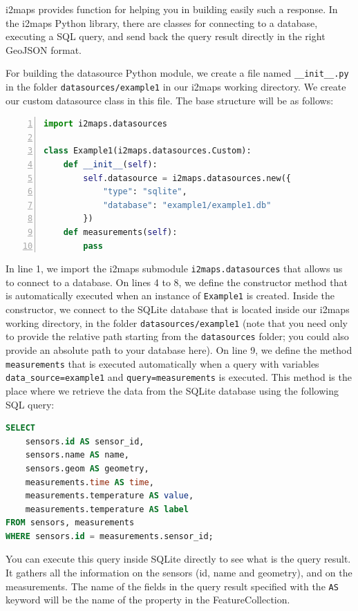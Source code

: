 \documentclass[11pt]{article}
\begin{document}
i2maps provides function for helping you in building easily such a response. In the i2maps Python library, there are classes for connecting to a database, executing a SQL query, and send back the query result directly in the right GeoJSON format.

For building the datasource Python module, we create a file named \verb=__init__.py= in the folder \texttt{datasources/example1} in our i2maps working directory. We create our custom datasource class in this file. The base structure will be as follows:

\begin{lstlisting}[language=Python, numbers=left, numberstyle=\footnotesize, numbersep=5pt]
import i2maps.datasources

class Example1(i2maps.datasources.Custom):
    def __init__(self):
        self.datasource = i2maps.datasources.new({
            "type": "sqlite",
            "database": "example1/example1.db"
        })
    def measurements(self):
        pass
\end{lstlisting}

In line 1, we import the i2maps submodule \texttt{i2maps.datasources} that allows us to connect to a database. On lines 4 to 8, we define the constructor method that is automatically executed when an instance of \texttt{Example1} is created. Inside the constructor, we connect to the SQLite database that is located inside our i2maps working directory, in the folder \texttt{datasources/example1} (note that you need only to provide the relative path starting from the \texttt{datasources} folder; you could also provide an absolute path to your database here). On line 9, we define the method \texttt{measurements} that is executed automatically when a query with variables \texttt{data\_source=example1} and \texttt{query=measurements} is executed. This method is the place where we retrieve the data from the SQLite database using the following SQL query:

\begin{lstlisting}[language=SQL]
SELECT 
	sensors.id AS sensor_id,
	sensors.name AS name,
	sensors.geom AS geometry,
	measurements.time AS time,
	measurements.temperature AS value,
	measurements.temperature AS label
FROM sensors, measurements
WHERE sensors.id = measurements.sensor_id;
\end{lstlisting}

You can execute this query inside SQLite directly to see what is the query result. It gathers all the information on the sensors (id, name and geometry), and on the measurements. The name of the fields in the query result specified with the \texttt{AS} keyword will be the name of the property in the FeatureCollection.
\end{document}
